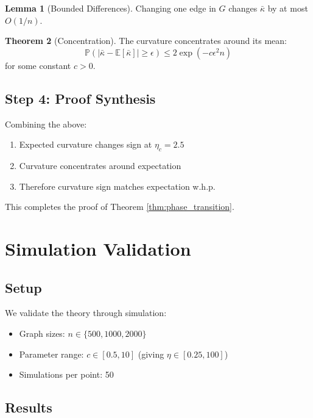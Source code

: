 \documentclass[11pt,a4paper]{article}
\theoremstyle{definition}
\newtheorem{theorem}{Theorem}[section]
\newtheorem{lemma}[theorem]{Lemma}
\begin{document}
\begin{lemma}[Bounded Differences]
Changing one edge in $G$ changes $\bar{\kappa}$ by at most $O(1/n)$.
\end{lemma}

\begin{theorem}[Concentration]
The curvature concentrates around its mean:
\begin{equation}
\mathbb{P}(|\bar{\kappa} - \mathbb{E}[\bar{\kappa}]| \geq \epsilon) \leq 2\exp(-c\epsilon^2 n)
\end{equation}
for some constant $c > 0$.
\end{theorem}

\subsection{Step 4: Proof Synthesis}

Combining the above:
\begin{enumerate}
    \item Expected curvature changes sign at $\eta_c = 2.5$
    \item Curvature concentrates around expectation
    \item Therefore curvature sign matches expectation w.h.p.
\end{enumerate}

This completes the proof of Theorem \ref{thm:phase_transition}.

\section{Simulation Validation}

\subsection{Setup}

We validate the theory through simulation:
\begin{itemize}
    \item Graph sizes: $n \in \{500, 1000, 2000\}$
    \item Parameter range: $c \in [0.5, 10]$ (giving $\eta \in [0.25, 100]$)
    \item Simulations per point: 50
\end{itemize}

\subsection{Results}
\end{document}
